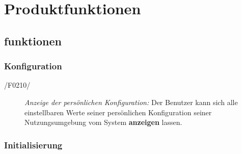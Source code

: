 \section{Produktfunktionen}

\subsection{funktionen}


\subsubsection{Konfiguration}

\begin{description}
  \item[/F0210/]
    \textit{Anzeige der persönlichen Konfiguration:}
    Der Benutzer kann sich alle einstellbaren Werte seiner persönlichen Konfiguration seiner Nutzungsumgebung vom System \textbf{anzeigen} lassen.
\end{description}



\subsubsection{Initialisierung}
